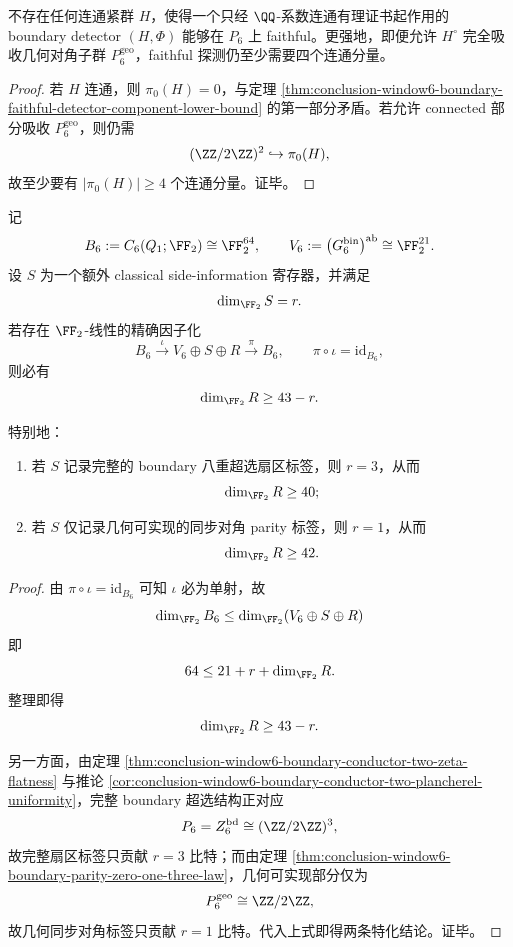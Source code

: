 \begin{corollary}\label{cor:conclusion-window6-boundary-faithful-connected-detector-impossible}
不存在任何连通紧群 \(H\)，使得一个只经 \(\QQ\)-系数连通有理证书起作用的 boundary detector \((H,\Phi)\) 能够在 \(P_6\) 上 faithful。更强地，即便允许 \(H^\circ\) 完全吸收几何对角子群 \(P_6^{\mathrm{geo}}\)，faithful 探测仍至少需要四个连通分量。
\end{corollary}
\begin{proof}
若 \(H\) 连通，则 \(\pi_0(H)=0\)，与定理 \ref{thm:conclusion-window6-boundary-faithful-detector-component-lower-bound} 的第一部分矛盾。若允许 connected 部分吸收 \(P_6^{\mathrm{geo}}\)，则仍需
\[
(\ZZ/2\ZZ)^2\hookrightarrow \pi_0(H),
\]
故至少要有 \(|\pi_0(H)|\ge 4\) 个连通分量。证毕。
\end{proof}

\begin{theorem}[超选信息不能显著削减精确重建成本]\label{thm:conclusion-window6-boundary-superselection-sideinfo-cost-lower-bound}
记
\[
B_6:=C_6(Q_1;\FF_2)\cong \FF_2^{64},
\qquad
V_6:=\bigl(G_6^{\mathrm{bin}}\bigr)^{\mathrm{ab}}\cong \FF_2^{21}.
\]
设 \(S\) 为一个额外 classical side-information 寄存器，并满足
\[
\dim_{\FF_2}S=r.
\]
若存在 \(\FF_2\)-线性的精确因子化
\[
B_6 \xrightarrow{\ \iota\ } V_6\oplus S\oplus R
\xrightarrow{\ \pi\ } B_6,
\qquad
\pi\circ \iota=\mathrm{id}_{B_6},
\]
则必有
\[
\dim_{\FF_2}R\ge 43-r.
\]

特别地：
\begin{enumerate}
  \item 若 \(S\) 记录完整的 boundary 八重超选扇区标签，则 \(r=3\)，从而
  \[
  \dim_{\FF_2}R\ge 40;
  \]
  \item 若 \(S\) 仅记录几何可实现的同步对角 parity 标签，则 \(r=1\)，从而
  \[
  \dim_{\FF_2}R\ge 42.
  \]
\end{enumerate}
\end{theorem}
\begin{proof}
由 \(\pi\circ\iota=\mathrm{id}_{B_6}\) 可知 \(\iota\) 必为单射，故
\[
\dim_{\FF_2}B_6
\le
\dim_{\FF_2}(V_6\oplus S\oplus R)
\]
即
\[
64\le 21+r+\dim_{\FF_2}R.
\]
整理即得
\[
\dim_{\FF_2}R\ge 43-r.
\]

另一方面，由定理 \ref{thm:conclusion-window6-boundary-conductor-two-zeta-flatness} 与推论 \ref{cor:conclusion-window6-boundary-conductor-two-plancherel-uniformity}，完整 boundary 超选结构正对应
\[
P_6=Z_6^{\mathrm{bd}}\cong (\ZZ/2\ZZ)^3,
\]
故完整扇区标签只贡献 \(r=3\) 比特；而由定理 \ref{thm:conclusion-window6-boundary-parity-zero-one-three-law}，几何可实现部分仅为
\[
P_6^{\mathrm{geo}}\cong \ZZ/2\ZZ,
\]
故几何同步对角标签只贡献 \(r=1\) 比特。代入上式即得两条特化结论。证毕。
\end{proof}

